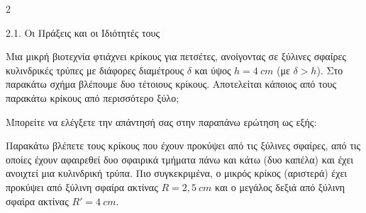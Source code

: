 \begin{ylh}{2}
    \item 2.1. Οι Πράξεις και οι Ιδιότητές τους
\end{ylh}
Μια μικρή βιοτεχνία φτιάχνει κρίκους για πετσέτες, ανοίγοντας σε ξύλινες σφαίρες κυλινδρικές τρύπες με διάφορες διαμέτρους $\delta$ και ύψος $h = 4\ cm$ (με $\delta > h$). Στο παρακάτω σχήμα βλέπουμε δυο τέτοιους κρίκους. Αποτελείται κάποιος από τους παρακάτω κρίκους από περισσότερο ξύλο;

\begin{center}
\end{center}

Μπορείτε να ελέγξετε την απάντησή σας στην παραπάνω ερώτηση ως εξής:

Παρακάτω βλέπετε τους κρίκους που έχουν προκύψει από τις ξύλινες σφαίρες, από τις οποίες έχουν αφαιρεθεί δυο σφαιρικά τμήματα πάνω και κάτω (δυο καπέλα) και έχει ανοιχτεί μια κυλινδρική τρύπα. Πιο συγκεκριμένα, ο μικρός κρίκος (αριστερά) έχει προκύψει από ξύλινη σφαίρα ακτίνας $R = 2{,}5\ cm$ και ο μεγάλος δεξιά από ξύλινη σφαίρα ακτίνας $R' = 4\ cm$.

